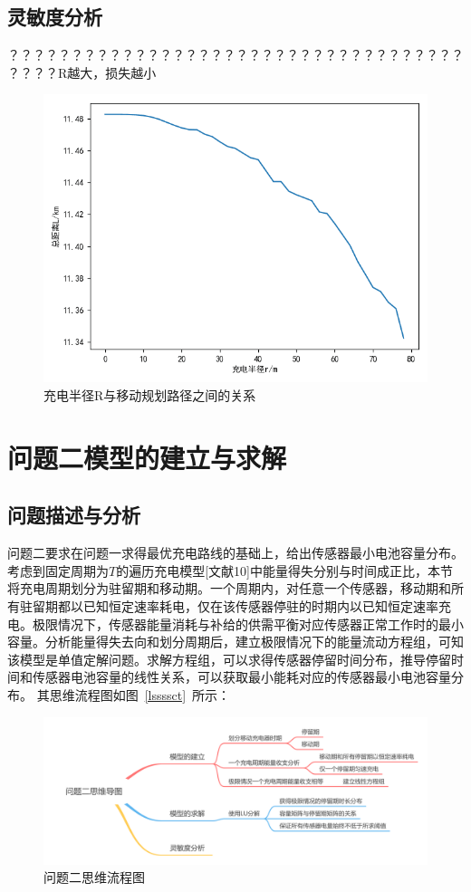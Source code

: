 \documentclass{whutmod}
\begin{document}
	\subsection{灵敏度分析}
	？？？？？？？？？？？？？？？？？？？？？？？？？？？？？？？？？？？？？？？？R越大，损失越小
	
	    \begin{figure}[H]
		\centering
		\includegraphics[width=.8\textwidth]{figures/ssss.png}
		\caption{充电半径R与移动规划路径之间的关系}\label{ssssssssssssss}
		\end{figure}
    

  
	\section{问题二模型的建立与求解}
		\subsection{问题描述与分析}

			问题二要求在问题一求得最优充电路线的基础上，给出传感器最小电池容量分布。考虑到固定周期为$T$的遍历充电模型[文献10]中能量得失分别与时间成正比，本节将充电周期划分为驻留期和移动期。一个周期内，对任意一个传感器，移动期和所有驻留期都以已知恒定速率耗电，仅在该传感器停驻的时期内以已知恒定速率充电。极限情况下，传感器能量消耗与补给的供需平衡对应传感器正常工作时的最小容量。分析能量得失去向和划分周期后，建立极限情况下的能量流动方程组，可知该模型是单值定解问题。求解方程组，可以求得传感器停留时间分布，推导停留时间和传感器电池容量的线性关系，可以获取最小能耗对应的传感器最小电池容量分布。
			其思维流程图如图~\ref{lssssct}~所示：
			
			\begin{figure}[H]
				\centering
				\includegraphics[width=\textwidth]{figures/222222.png}
				\caption{问题二思维流程图}\label{ssssct}
			\end{figure}
		
\end{document}
